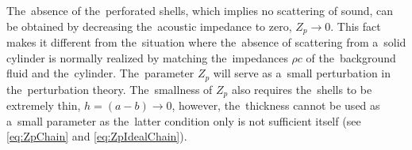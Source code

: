 

The~absence of the~perforated shells, which implies no scattering of sound, can be obtained by decreasing the~acoustic impedance to zero, $Z_p\rightarrow 0$.
This fact makes it different from the~situation where the~absence of scattering from a~solid cylinder is normally realized by matching the~impedances $\rho c$ of the~background fluid and the~cylinder.
The~parameter $Z_p$ will serve as a~small perturbation in the~perturbation theory.
The~smallness of $Z_p$ also requires the~shells to be extremely thin, $h=\left(a-b\right) \rightarrow 0$, however, the~thickness cannot be used as a~small parameter as the~latter condition only is not sufficient itself (see \cref{eq:ZpChain} and \cref{eq:ZpIdealChain}).


